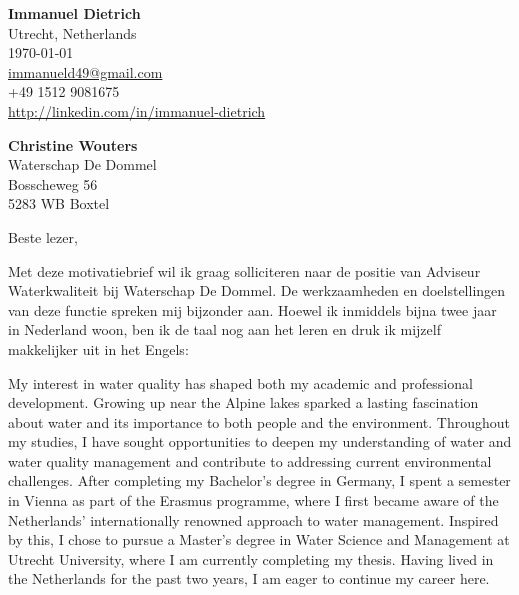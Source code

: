 \documentclass[11pt]{report}
\begin{document}
 
\begin{titlepage}

    \begin{minipage}[t]{0.95\textwidth}
        \hfill
        \raggedleft
        \textbf{Immanuel Dietrich} \\
        Utrecht, Netherlands \\
        \today\\
        \href{mailto:immanueld49@gmail.com}{immanueld49@gmail.com} \\
        +49 1512 9081675 \\
        \url{http://linkedin.com/in/immanuel-dietrich}
    \end{minipage}

\raggedright \textbf{Christine Wouters} \\ Waterschap De Dommel \\  Bosscheweg 56 \\  5283 WB Boxtel \\ 

\vspace{0.7em}

\raggedright Beste lezer,\\

\vspace{0.7em}

Met deze motivatiebrief wil ik graag solliciteren naar de positie van Adviseur Waterkwaliteit bij Waterschap De Dommel. De werkzaamheden en doelstellingen van deze functie spreken mij bijzonder aan. 
Hoewel ik inmiddels bijna twee jaar in Nederland woon, ben ik de taal nog aan het leren en druk ik mijzelf makkelijker uit in het Engels:

\vspace{0.7em}

My interest in water quality has shaped both my academic and professional development. Growing up near the Alpine lakes sparked a lasting fascination about water and its importance to both people and the environment. 
Throughout my studies, I have sought opportunities to deepen my understanding of water and water quality management and contribute to addressing current environmental challenges. After completing my Bachelor's degree in Germany, 
I spent a semester in Vienna as part of the Erasmus programme, where I first became aware of the Netherlands' internationally renowned approach to water management. Inspired by this, I chose to pursue a Master's degree 
in Water Science and Management at Utrecht University, where I am currently completing my thesis. Having lived in the Netherlands for the past two years, I am eager to continue my career here.


\end{titlepage}
\end{document}
